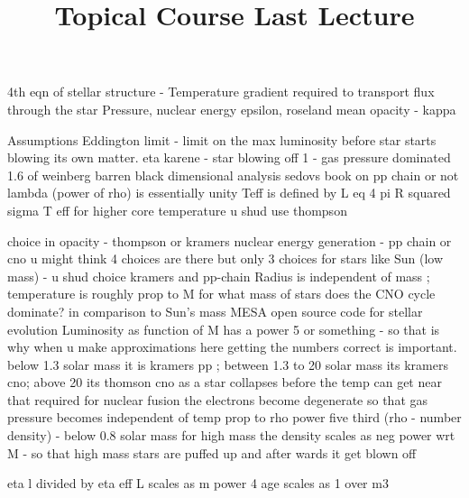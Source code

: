 \documentclass{../template/texnote}
\title{Topical Course Last Lecture}
\begin{document}
    \maketitle {}

4th eqn of stellar structure - Temperature gradient required to transport flux through the star
Pressure, nuclear energy epsilon, roseland mean opacity - kappa

Assumptions
Eddington limit - limit on the max luminosity before star starts blowing its own matter.
eta karene - star blowing off
1 - gas pressure dominated
1.6 of weinberg
barren black dimensional analysis
sedovs book on 
pp chain or not lambda (power of rho) is essentially unity
Teff is defined by L eq 4 pi R squared sigma T eff
for higher core temperature u shud use thompson

choice in opacity - thompson or kramers
nuclear energy generation - pp chain or cno
 u might think 4 choices are there but only 3 choices
 for stars like Sun (low mass) - u shud choice kramers and pp-chain 
 Radius is independent of mass ; temperature is roughly prop to M
 for what mass of stars does the CNO cycle dominate? in comparison to Sun's mass
 MESA open source code for stellar evolution
 Luminosity as function of M has a power 5 or something - so that is why when u make approximations
 here getting the numbers correct is important.
 below 1.3 solar mass it is kramers pp ; between 1.3 to 20 solar mass its kramers cno;
 above 20 its thomson cno
 as a star collapses before the temp can get near that required for nuclear fusion
 the electrons become degenerate so that gas pressure becomes independent of temp
 prop to rho power five third (rho - number density) - below 0.8 solar mass
 for high mass the density scales as neg power wrt M - so that high mass stars are puffed up and after wards it get blown off

 eta l divided by eta eff
 L scales as m power 4
 age scales as 1 over m3
    \printbibliography
\end{document}

